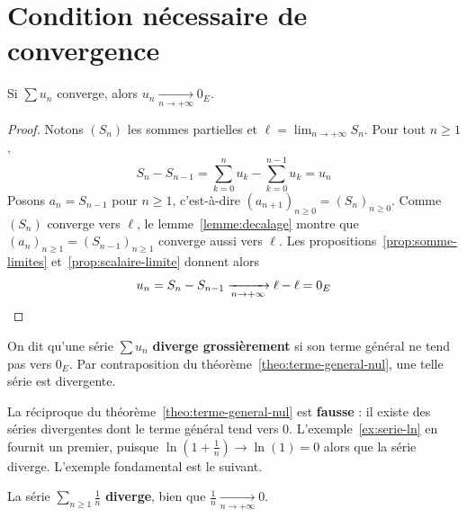 \section{Condition nécessaire de convergence}
\label{sec:condition-necessaire}

\begin{theo}
\label{theo:terme-general-nul}
Si $\sum u_n$ converge, alors $u_n\xrightarrow[n\to+\infty]{}0_E$.
\end{theo}

\begin{proof}
Notons $(S_n)$ les sommes partielles et $\ell=\lim_{n\to+\infty}S_n$. Pour tout $n\geq 1$,
\[S_n - S_{n-1} = \sum_{k=0}^{n}u_k - \sum_{k=0}^{n-1}u_k = u_n\]
Posons $a_n=S_{n-1}$ pour $n\geq 1$, c'est-à-dire $(a_{n+1})_{n\geq 0}=(S_n)_{n\geq 0}$. Comme $(S_n)$ converge vers $\ell$, le lemme~\ref{lemme:decalage} montre que $(a_n)_{n\geq1}=(S_{n-1})_{n\geq1}$ converge aussi vers $\ell$. Les propositions~\ref{prop:somme-limites} et~\ref{prop:scalaire-limite} donnent alors
\[u_n = S_n - S_{n-1} \xrightarrow[n\to+\infty]{} \ell-\ell = 0_E\qedhere\]
\end{proof}

\begin{defi}
\label{defi:divergence-grossiere}
On dit qu'une série $\sum u_n$ \textbf{diverge grossièrement} si son terme général ne tend pas vers $0_E$. Par contraposition du théorème~\ref{theo:terme-general-nul}, une telle série est divergente.
\end{defi}

\begin{remarque}
La réciproque du théorème~\ref{theo:terme-general-nul} est \textbf{fausse} : il existe des séries divergentes dont le terme général tend vers $0$. L'exemple~\ref{ex:serie-ln} en fournit un premier, puisque $\ln(1+\frac1n)\to\ln(1)=0$ alors que la série diverge. L'exemple fondamental est le suivant.
\end{remarque}

\begin{exemple}
\label{ex:serie-harmonique}
La série $\displaystyle\sum_{n\geq1}\frac{1}{n}$ \textbf{diverge}, bien que $\frac1n\xrightarrow[n\to+\infty]{}0$.
\end{exemple}

